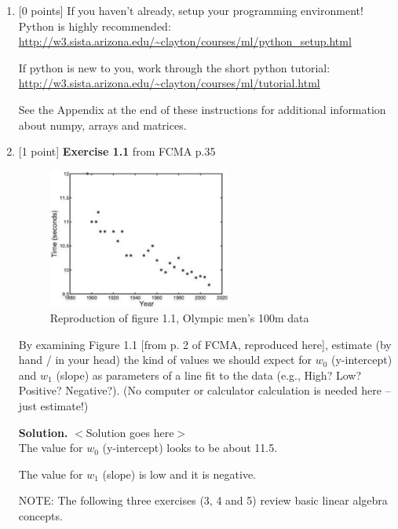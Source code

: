 \documentclass[10pt]{article}
\begin{document}
\newpage
\begin{enumerate}


\item \label{prob:1} [0 points]
If you haven't already, setup your programming environment!  Python is highly recommended:\\
\url{http://w3.sista.arizona.edu/~clayton/courses/ml/python_setup.html}

If python is new to you, work through the short python tutorial:\\
\url{http://w3.sista.arizona.edu/~clayton/courses/ml/tutorial.html}

See the Appendix at the end of these instructions for additional information about numpy, arrays and matrices.



\item \label{prob:2} [1 point]
{\bf Exercise 1.1} from FCMA p.35

\begin{figure}[htb]
\begin{center}
\includegraphics[width=6cm]{figures/figure1-1_p2}
\caption{Reproduction of figure 1.1, Olympic men's 100m data}
\end{center}
\end{figure}
By examining Figure 1.1 [from p. 2 of FCMA, reproduced here], estimate (by hand / in your head) the kind of values we should expect for $w_0$ (y-intercept) and $w_1$ (slope) as parameters of a line fit to the data (e.g., High? Low?  Positive?  Negative?).  (No computer or calculator calculation is needed here -- just estimate!)

{\bf Solution.} $<$Solution goes here$>$\\

The value for $w_0$ (y-intercept) looks to be about 11.5. 


The value for $w_1$ (slope) is low and it is negative.


\newpage
NOTE: The following three exercises (3, 4 and 5) review basic linear algebra concepts.


\end{enumerate}
\end{document}
